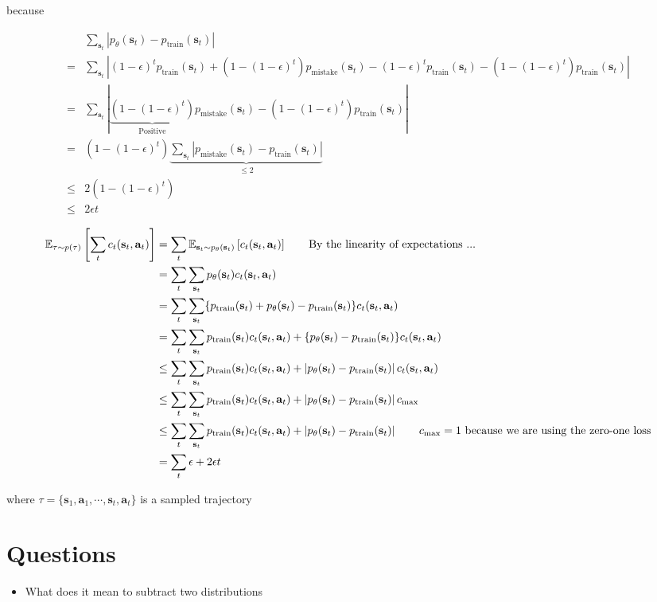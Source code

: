 \documentclass{article}
\newcommand{\state}{\mathbf{s}}
\newcommand{\action}{\mathbf{a}}
\begin{document}
because 

\begin{align*}
&\sum_{\state_t} \left| p_{\theta}\left(\mathbf{s}_{t}\right)-p_{\text {train}}\left(\mathbf{s}_{t}\right)  \right| \\
=&
\sum_{\state_t}
\left| 
(1-\epsilon)^t p_{\text{train}} (\state_t) + 
(1 - (1 - \epsilon)^t) p_{\text{mistake}}(\state_t) -
(1-\epsilon)^t p_{\text{train}} (\state_t) - 
(1 - (1 - \epsilon)^t) p_{\text{train}}(\state_t) 
\right|
\\
=& 
\sum_{\state_t}
\left|
\underbrace{(1 - (1 - \epsilon)^t)}_{\text{Positive}} p_{\text{mistake}}(\state_t) -
(1 - (1 - \epsilon)^t) p_{\text{train}}(\state_t)
\right|
\\
=& 
(1 - (1 - \epsilon)^t) 
\underbrace{
\sum_{\state_t}
\left|
p_{\text{mistake}}(\state_t) - p_{\text{train}}(\state_t)
\right|
}_{\leq 2}
\\
\leq& 2 (1 - (1 - \epsilon)^t) 
\\
\leq& 2 \epsilon t \tag*{Using the inequality that $(1-\epsilon)^t \geq 1 - \epsilon t$ for $\epsilon \in [0, 1]$}
\end{align*}

\begin{align*}
\mathbb{E}_{\tau \sim p(\tau)}\left[\sum_{t} c_t(\state_t, \action_t)\right] 
&= \sum_t \mathbb{E}_{\state_t \sim p_{\theta}(\state_t)} \left[ c_t(\state_t, \action_t) \right] \tag*{By the linearity of expectations ...} \\
&= \sum_t \sum_{\state_t} p_{\theta}(\state_t) c_t(\state_t, \action_t) \\
&= \sum_t \sum_{\state_t} \{p_{\text{train}}(\state_t) + p_{\theta}(\state_t) - p_{\text{train}}(\state_t)\} c_t(\state_t, \action_t) \\
&= \sum_t \sum_{\state_t} p_{\text{train}}(\state_t) c_t(\state_t, \action_t) +
\{p_{\theta}(\state_t) - p_{\text{train}}(\state_t)\} c_t(\state_t, \action_t)\\
&\leq \sum_t \sum_{\state_t} p_{\text{train}}(\state_t) c_t(\state_t, \action_t) +
\left| p_{\theta}(\state_t) - p_{\text{train}}(\state_t)\right| c_t(\state_t, \action_t)\\
&\leq \sum_t \sum_{\state_t} p_{\text{train}}(\state_t) c_t(\state_t, \action_t) +
\left| p_{\theta}(\state_t) - p_{\text{train}}(\state_t)\right| c_{\max}\\
&\leq \sum_t \sum_{\state_t} p_{\text{train}}(\state_t) c_t(\state_t, \action_t) +
\left| p_{\theta}(\state_t) - p_{\text{train}}(\state_t)\right| \tag*{$c_{\max}=1$ because we are using the zero-one loss}\\ 
&= \sum_t \epsilon + 2\epsilon t
\end{align*} 

where $\tau = \{ \state_1, \action_1, \cdots, \state_t, \action_t\}$ is a sampled trajectory

\section{Questions}

\begin{itemize}
	\item What does it mean to subtract two distributions
\end{itemize}
\end{document}
